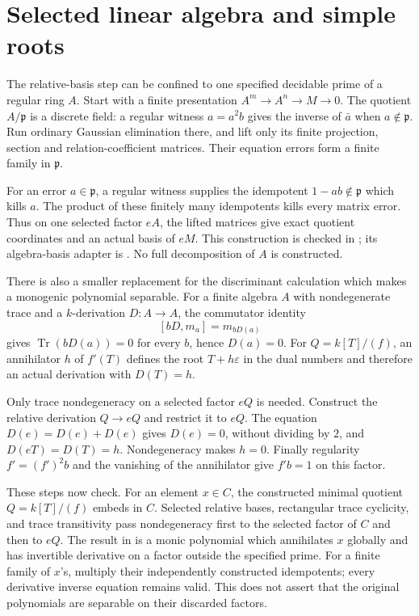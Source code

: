 \documentclass[11pt]{article}
\newcommand{\Tr}{\operatorname{Tr}}
\begin{document}
\section{Selected linear algebra and simple roots}

The relative-basis step can be confined to one specified decidable prime
of a regular ring $A$. Start with a finite presentation
$A^m\to A^n\to M\to0$. The quotient $A/\mathfrak p$ is a discrete
field: a regular witness $a=a^2b$ gives the inverse of $\bar a$ when
$a\notin\mathfrak p$. Run ordinary Gaussian elimination there, and lift
only its finite projection, section and relation-coefficient matrices.
Their equation errors form a finite family in $\mathfrak p$.

For an error $a\in\mathfrak p$, a regular witness supplies the idempotent
$1-ab\notin\mathfrak p$ which kills $a$. The product of these finitely
many idempotents kills every matrix error. Thus on one selected factor
$eA$, the lifted matrices give exact quotient coordinates and an actual
basis of $eM$. This construction is checked in
; its algebra-basis adapter is
. No full decomposition of $A$
is constructed.

There is also a smaller replacement for the discriminant calculation
which makes a monogenic polynomial separable. For a finite algebra $A$
with nondegenerate trace and a $k$-derivation $D:A\to A$, the commutator
identity
\[
 [bD,m_a]=m_{bD(a)}
\]
gives $\Tr(bD(a))=0$ for every $b$, hence $D(a)=0$.
For $Q=k[T]/(f)$, an annihilator $h$ of $f'(T)$ defines the root
$T+h\varepsilon$ in the dual numbers and therefore an actual
derivation with $D(T)=h$.

Only trace nondegeneracy on a selected factor $eQ$ is needed. Construct
the relative derivation $Q\to eQ$ and restrict it to $eQ$.
The equation $D(e)=D(e)+D(e)$ gives $D(e)=0$, without dividing by $2$,
and $D(eT)=D(T)=h$. Nondegeneracy makes $h=0$.
Finally regularity $f'=(f')^2b$ and the vanishing of the annihilator
give $f'b=1$ on this factor.

These steps now check. For an element $x\in C$, the constructed minimal
quotient $Q=k[T]/(f)$ embeds in $C$. Selected relative bases, rectangular
trace cyclicity, and trace transitivity pass nondegeneracy first to the
selected factor of $C$ and then to $eQ$. The result in
 is a monic polynomial which
annihilates $x$ globally and has invertible derivative on a factor
outside the specified prime. For a finite family of $x$'s, multiply
their independently constructed idempotents; every derivative inverse
equation remains valid. This does not assert that the original
polynomials are separable on their discarded factors.
\end{document}
